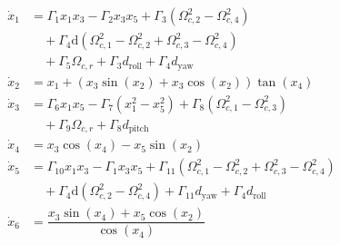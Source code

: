 \documentclass[3p]{elsarticle}
\begin{document}
\begin{align}
    \dot{x}_1 &= \Gamma_1 x_1 x_3 - \Gamma_2 x_3 x_5 + \Gamma_3 (\Omega_{c, 2}^2 - \Omega_{c, 4}^2) \nonumber \\
    &\quad + \Gamma_4 \mathrm{d} (\Omega_{c, 1}^2 - \Omega_{c, 2}^2 + \Omega_{c, 3}^2 - \Omega_{c, 4}^2) \nonumber \\
    &\quad + \Gamma_5 \Omega_{c, r} + \Gamma_3 d_{\text{roll}} + \Gamma_4 d_{\text{yaw}}  \label{eq:eq_of_motion_start1} \\
    \dot{x}_2 &= x_1 + (x_3\sin(x_2) + x_3\cos(x_2))\tan(x_4) \nonumber \\
    \dot{x}_3 &= \Gamma_6 x_1 x_5 - \Gamma_7 (x_1^2 - x_5^2) + \Gamma_8 (\Omega_{c, 1}^2 - \Omega_{c, 3}^2) \nonumber \\
    &\quad + \Gamma_9 \Omega_{c, r} + \Gamma_8 d_{\text{pitch}} \\
    \dot{x}_4 &= x_3\cos(x_4) - x_5\sin(x_2) \\
    \dot{x}_5 &= \Gamma_{10} x_1 x_3 - \Gamma_{1} x_3 x_5 + \Gamma_{11} (\Omega_{c, 1}^2 - \Omega_{c, 2}^2 + \Omega_{c, 3}^2 - \Omega_{c, 4}^2) \nonumber \\
    &\quad + \Gamma_{4} \mathrm{d} (\Omega_{c, 2}^2 - \Omega_{c, 4}^2) + \Gamma_{11} d_{\text{yaw}} + \Gamma_{4} d_{\text{roll}} \\
    \dot{x}_6 &= \dfrac{x_3\sin(x_4) + x_5\cos(x_2)}{\cos(x_4)}~\label{eq:eq_of_motion_end1}
\end{align}
\end{document}
